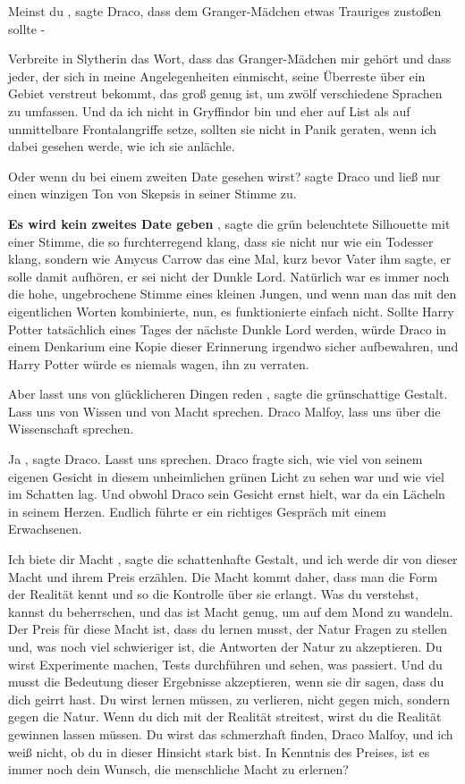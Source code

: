 \glqq Meinst du\grqq{} , sagte Draco, \glqq dass dem Granger-Mädchen etwas
Trauriges zustoßen sollte -\grqq{}

\glqq Verbreite in Slytherin das Wort, dass das Granger-Mädchen mir gehört und
dass jeder, der sich in meine Angelegenheiten einmischt, seine Überreste über
ein Gebiet verstreut bekommt, das groß genug ist, um zwölf verschiedene Sprachen
zu umfassen. Und da ich nicht in Gryffindor bin und eher auf List als auf
unmittelbare Frontalangriffe setze, sollten sie nicht in Panik geraten, wenn ich
dabei gesehen werde, wie ich sie anlächle.\grqq{}

\glqq Oder wenn du bei einem zweiten Date gesehen wirst?\grqq{} sagte Draco und
ließ nur einen winzigen Ton von Skepsis in seiner Stimme zu.

\textbf{ \glqq Es wird kein zweites Date geben\grqq{} }, sagte die grün
beleuchtete Silhouette mit einer Stimme, die so furchterregend klang, dass sie
nicht nur wie ein Todesser klang, sondern wie Amycus Carrow das eine Mal, kurz
bevor Vater ihm sagte, er solle damit aufhören, er sei nicht der Dunkle Lord.
Natürlich war es immer noch die hohe, ungebrochene Stimme eines kleinen Jungen,
und wenn man das mit den eigentlichen Worten kombinierte, nun, es funktionierte
einfach nicht. Sollte Harry Potter tatsächlich eines Tages der nächste Dunkle
Lord werden, würde Draco in einem Denkarium eine Kopie dieser Erinnerung
irgendwo sicher aufbewahren, und Harry Potter würde es niemals wagen, ihn zu
verraten.

\glqq Aber lasst uns von glücklicheren Dingen reden\grqq{} , sagte die
grünschattige Gestalt. \glqq Lass uns von Wissen und von Macht sprechen. Draco
Malfoy, lass uns über die Wissenschaft sprechen.\grqq{}

\glqq Ja\grqq{} , sagte Draco. \glqq Lasst uns sprechen.\grqq{} Draco fragte
sich, wie viel von seinem eigenen Gesicht in diesem unheimlichen grünen Licht zu
sehen war und wie viel im Schatten lag. Und obwohl Draco sein Gesicht ernst
hielt, war da ein Lächeln in seinem Herzen. Endlich führte er ein richtiges
Gespräch mit einem Erwachsenen.

\glqq Ich biete dir Macht\grqq{} , sagte die schattenhafte Gestalt, \glqq und
ich werde dir von dieser Macht und ihrem Preis erzählen. Die Macht kommt daher,
dass man die Form der Realität kennt und so die Kontrolle über sie erlangt. Was
du verstehst, kannst du beherrschen, und das ist Macht genug, um auf dem Mond zu
wandeln. Der Preis für diese Macht ist, dass du lernen musst, der Natur Fragen
zu stellen und, was noch viel schwieriger ist, die Antworten der Natur zu
akzeptieren. Du wirst Experimente machen, Tests durchführen und sehen, was
passiert. Und du musst die Bedeutung dieser Ergebnisse akzeptieren, wenn sie dir
sagen, dass du dich geirrt hast. Du wirst lernen müssen, zu verlieren, nicht
gegen mich, sondern gegen die Natur. Wenn du dich mit der Realität streitest,
wirst du die Realität gewinnen lassen müssen. Du wirst das schmerzhaft finden,
Draco Malfoy, und ich weiß nicht, ob du in dieser Hinsicht stark bist. In
Kenntnis des Preises, ist es immer noch dein Wunsch, die menschliche Macht zu
erlernen?\grqq{}

